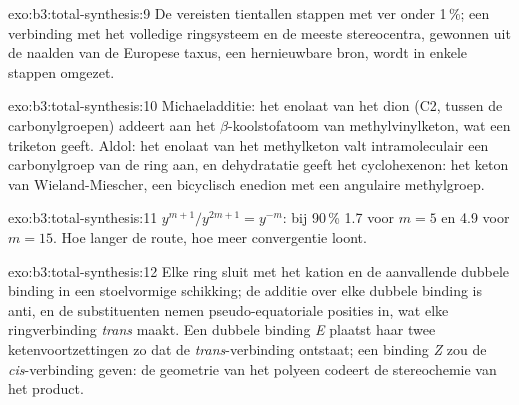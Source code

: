 \begin{solution}{exo:b3:total-synthesis:9}
De  vereisten tientallen stappen met  ver
onder 1\,\%; een verbinding met het volledige ringsysteem en de meeste
stereocentra, gewonnen uit de naalden van de Europese taxus, een
hernieuwbare bron, wordt in enkele stappen omgezet.
\end{solution}

\begin{solution}{exo:b3:total-synthesis:10}
Michaeladditie: het enolaat van het dion (C2, tussen de carbonylgroepen) addeert aan het
$\beta$-koolstofatoom van methylvinylketon, wat een triketon geeft. Aldol: het enolaat
van het methylketon valt intramoleculair een carbonylgroep van de ring
aan, en dehydratatie geeft het cyclohexenon: het keton van
Wieland-Miescher, een bicyclisch enedion met een angulaire methylgroep.
\end{solution}

\begin{solution}{exo:b3:total-synthesis:11}
$y^{m+1}/y^{2m+1} = y^{-m}$: bij 90\,\% 1.7 voor $m = 5$ en 4.9 voor $m = 15$. Hoe langer de route, hoe meer
convergentie loont.
\end{solution}

\begin{solution}{exo:b3:total-synthesis:12}
Elke ring sluit met het kation en de aanvallende dubbele binding in een
stoelvormige schikking; de additie over elke dubbele binding is anti, en
de substituenten nemen pseudo-equatoriale posities in, wat elke
ringverbinding \textit{trans} maakt. Een dubbele binding \textit{E}
plaatst haar twee ketenvoortzettingen zo dat de \textit{trans}-verbinding ontstaat; een binding \textit{Z} zou
de \textit{cis}-verbinding geven: de geometrie van het polyeen codeert de stereochemie van
het product.
\end{solution}

